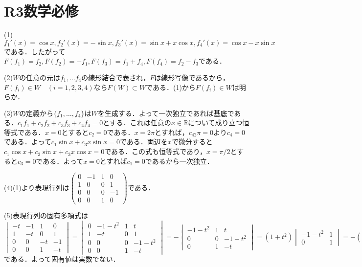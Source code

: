 \documentclass[
		book,
		head_space=20mm,
		foot_space=20mm,
		gutter=10mm,
		line_length=190mm
]{jlreq}
\begin{document}
\section{R3数学必修}
(1)$f_1'(x)=\cos x,f_2'(x)=-\sin x,f_3'(x)=\sin x +x\cos x,f_4'(x)=\cos x -x\sin x$である．したがって$F(f_1)=f_2,F(f_2)=-f_1,F(f_3)=f_1+f_4,F(f_4)=f_2-f_3$である．

(2)$W$の任意の元は$f_1,\dots f_4$の線形結合で表され，$F$は線形写像であるから，
$F(f_i)\in W\quad(i=1,2,3,4)$なら$F(W)\subset W$である．(1)から$F(f_i)\in W$は明らか．

(3)$W$の定義から$\{ f_1,\dots,f_4 \}$は$W$を生成する．よって一次独立であれば基底である．$c_1f_1+c_2f_2+c_3f_3+c_4f_4=0$とする．これは任意の$x \in \mathbb{R}$について成り立つ恒等式である．$x=0$とすると$c_2=0$である．$x=2\pi$とすれば，$c_42\pi=0$より$c_4=0$である．よって$c_1\sin x+c_3x\sin x=0$である．両辺を$x$で微分すると$c_1\cos x+c_3\sin x+c_3x\cos x=0$である．この式も恒等式であり，$x=\pi/2$とすると$c_3=0$である．よって$x=0$とすれば$c_1=0$であるから一次独立．

(4)(1)より表現行列は$\begin{pmatrix}
    0 & -1 & 1 & 0\\
    1 & 0 & 0 & 1\\
    0 & 0 & 0 & -1\\
    0 & 0 & 1 & 0
\end{pmatrix}$である．

(5)表現行列の固有多項式は$\begin{vmatrix}
    -t & -1 & 1 & 0\\
    1 & -t & 0 & 1\\
    0 & 0 & -t & -1\\
    0 & 0 & 1 & -t
    \end{vmatrix}=\begin{vmatrix}
        0 & -1-t^2 & 1 & t \\
        1 & -t & 0 & 1\\
        0 & 0 & 0 & -1-t^2\\
        0 & 0 & 1 & -t
    \end{vmatrix}=-\begin{vmatrix}
        -1-t^2 & 1 & t\\    
        0 & 0 & -1-t^2\\
        0 & 1 & -t
    \end{vmatrix}=(1+t^2)\begin{vmatrix}
        -1-t^2 & 1\\
        0 & 1
    \end{vmatrix}=-(1+t^2)^2$である．よって固有値は実数でない．
\end{document}
